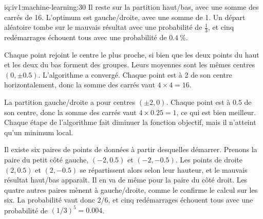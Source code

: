 \begin{solution}{iq:iv1:machine-learning:30}
Il reste sur la partition haut/bas, avec une somme des carrés de 16. L'optimum est gauche/droite, avec une somme de 1. Un départ aléatoire tombe sur le mauvais résultat avec une probabilité de $\frac13$, et cinq redémarrages échouent tous avec une probabilité de $0.4~\%$.

Chaque point rejoint le centre le plus proche, si bien que les deux points du haut et les deux du bas forment des groupes. Leurs moyennes sont les mêmes centres $(0, \pm 0.5)$. L'algorithme a convergé. Chaque point est à 2 de son centre horizontalement, donc la somme des carrés vaut $4 \times 4 = 16$.

La partition gauche/droite a pour centres $(\pm 2, 0)$. Chaque point est à $0.5$ de son centre, donc la somme des carrés vaut $4 \times 0.25 = 1$, ce qui est bien meilleur. Chaque étape de l'algorithme fait diminuer la fonction objectif, mais il n'atteint qu'un minimum local.

Il existe six paires de points de données à partir desquelles démarrer. Prenons la paire du petit côté gauche, $(-2, 0.5)$ et $(-2, -0.5)$. Les points de droite $(2, 0.5)$ et $(2, -0.5)$ se répartissent alors selon leur hauteur, et le mauvais résultat haut/bas apparaît. Il en va de même pour la paire du côté droit. Les quatre autres paires mènent à gauche/droite, comme le confirme le calcul sur les six. La probabilité vaut donc $2/6$, et cinq redémarrages échouent tous avec une probabilité de $(1/3)^5 = 0.004$.



\end{solution}

